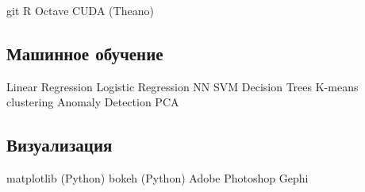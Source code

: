 \documentclass[a4paper]{resume}
\begin{document}
\begin{minipage}[t]{0.33\textwidth}
git \textbullet{}  R \textbullet{} Octave \textbullet{} CUDA (Theano)

\sectionspace


\subsection{Машинное обучение}
Linear Regression\textbullet{} Logistic Regression\textbullet{} NN\textbullet{} SVM\textbullet{} Decision Trees
K-means clustering \textbullet{} Anomaly Detection \textbullet{} PCA

\sectionspace 



\subsection{Визуализация}
matplotlib (Python) \textbullet{} bokeh (Python) \textbullet{} Adobe Photoshop \textbullet{} Gephi
\sectionspace



\end{minipage} %
\hfill
%
%
\end{document}
